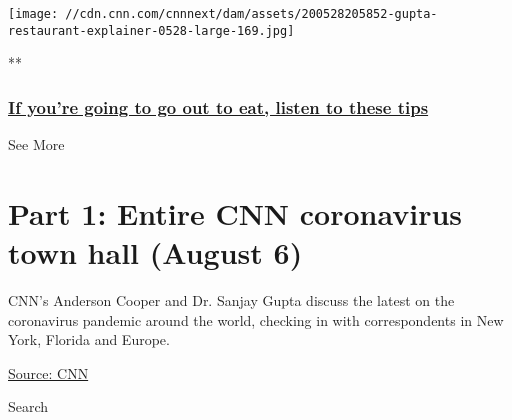 \href{/videos/health/2020/05/29/gupta-dining-out-restaurant-explainer-coronavirus-town-hall-vpx.cnn/video/playlists/cnn-coronavirus-town-hall/}{}

\texttt{[image: //cdn.cnn.com/cnnnext/dam/assets/200528205852-gupta-restaurant-explainer-0528-large-169.jpg]}

**

\hypertarget{if-youre-going-to-go-out-to-eat-listen-to-these-tips}{%
\subsubsection{\texorpdfstring{\href{/videos/health/2020/05/29/gupta-dining-out-restaurant-explainer-coronavirus-town-hall-vpx.cnn/video/playlists/cnn-coronavirus-town-hall/}{If
you're going to go out to eat, listen to these
tips}}{If you're going to go out to eat, listen to these tips}}\label{if-youre-going-to-go-out-to-eat-listen-to-these-tips}}

See More

\hypertarget{part-1-entire-cnn-coronavirus-town-hall-august-6-2}{%
\section{Part 1: Entire CNN coronavirus town hall (August
6)}\label{part-1-entire-cnn-coronavirus-town-hall-august-6-2}}

CNN's Anderson Cooper and Dr. Sanjay Gupta discuss the latest on the
coronavirus pandemic around the world, checking in with correspondents
in New York, Florida and Europe.

\href{https://www.cnn.com/}{Source: CNN}

Search

